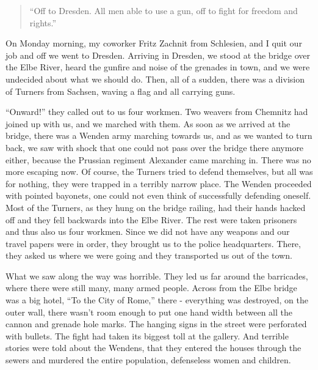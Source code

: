 \begin{quote}
``Off to Dresden. All men able to use a gun, off to fight for freedom and rights.''
\end{quote}

On Monday morning, my coworker Fritz Zachnit from Schlesien, and I quit our job and off we went to Dresden. Arriving in Dresden, we stood at the bridge over the Elbe River, heard the gunfire and noise of the grenades in town, and we were undecided about what we should do. Then, all of a sudden, there was a division of Turners from Sachsen, waving a flag and all carrying guns.

``Onward!'' they called out to us four workmen. Two weavers from Chemnitz had joined up with us, and we marched with them. As soon as we arrived at the bridge, there was a Wenden army marching towards us, and as we wanted to turn back, we saw with shock that one could not pass over the bridge there anymore either, because the Prussian regiment Alexander came marching in. There was no more escaping now. Of course, the Turners tried to defend themselves, but all was for nothing, they were trapped in a terribly narrow place. The Wenden proceeded with pointed bayonets, one could not even think of successfully defending oneself. Most of the Turners, as they hung on the bridge railing, had their hands hacked off and they fell backwards into the Elbe River. The rest were taken prisoners and thus also us four workmen. Since we did not have any weapons and our travel papers were in order, they brought us to the police headquarters. There, they asked us where we were going and they transported us out of the town.

What we saw along the way was horrible. They led us far around the barricades, where there were still many, many armed people. Across from the Elbe bridge was a big hotel, ``To the City of Rome,'' there - everything was destroyed, on the outer wall, there wasn't room enough to put one hand width between all the cannon and grenade hole marks. The hanging signs in the street were perforated with bullets. The fight had taken its biggest toll at the gallery. And terrible stories were told about the Wendens, that they entered the houses through the sewers and murdered the entire population, defenseless women and children.

